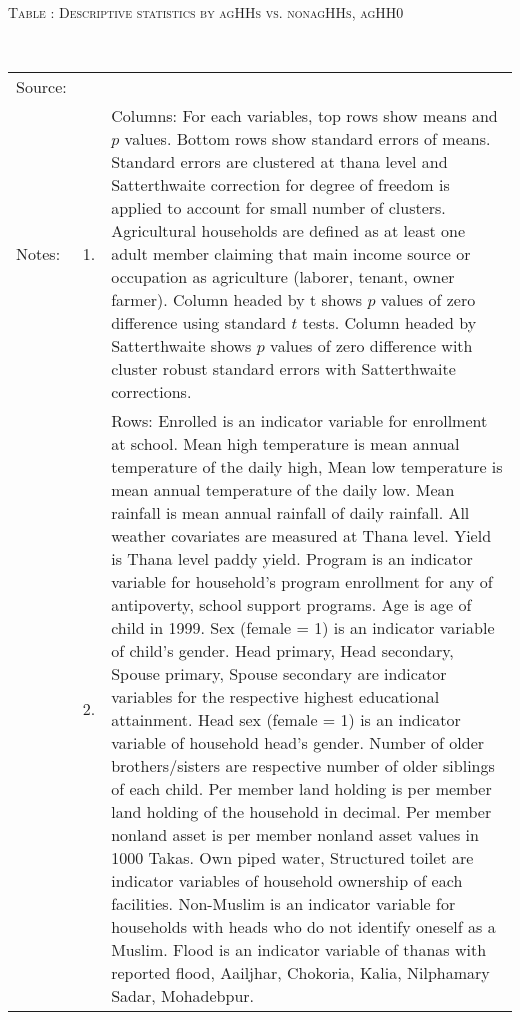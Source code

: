 \begin{minipage}[t]{14cm}
\hfil\textsc{\normalsize Table \thetable: Descriptive statistics by agHHs vs. nonagHHs, agHH0\label{tab destat by agHH0 CRSE}}\\
\setlength{\tabcolsep}{1pt}
\renewcommand{\arraystretch}{.70}
\hfil{}\\
\renewcommand{\arraystretch}{.7}
\setlength{\tabcolsep}{1pt}
\begin{tabular}{>{\hfill\scriptsize}p{1cm}<{}>{\hfill\scriptsize}p{.25cm}<{}>{\scriptsize}p{12cm}<{\hfill}}
Source:& \multicolumn{2}{l}{\scriptsize Compiled from IFPRI data. All information is of year 1999.}\\
Notes: & 1. & Columns: For each variables, top rows show means and $p$ values. Bottom rows show standard errors of means. Standard errors are clustered at thana level and Satterthwaite correction for degree of freedom is applied to account for small number of clusters. Agricultural households are defined as at least one adult member claiming that main income source or occupation as agriculture (laborer, tenant, owner farmer). Column headed by \textsf{t} shows $p$ values of zero difference using standard $t$ tests. Column headed by \textsf{Satterthwaite} shows $p$ values of zero difference with cluster robust standard errors with Satterthwaite corrections.\\
& 2. & Rows:  \textsf{Enrolled} is an indicator variable for enrollment at school. \textsf{Mean high temperature} is mean annual temperature of the daily high, \textsf{Mean low temperature} is mean annual temperature of the daily low. \textsf{Mean rainfall} is mean annual rainfall of daily rainfall. All weather covariates are measured at Thana level. \textsf{Yield} is Thana level paddy yield. \textsf{Program} is an indicator variable for household's program enrollment for any of antipoverty, school support programs. \textsf{Age} is age of child in 1999.  \textsf{Sex (female = 1)} is an indicator variable of child's gender. \textsf{Head primary, Head secondary, Spouse primary, Spouse secondary} are indicator variables for the respective highest educational attainment. \textsf{Head sex (female = 1)} is an indicator variable of household head's gender. \textsf{Number of older brothers/sisters} are respective number of older siblings of each child. \textsf{Per member land holding} is per member land holding of the household in decimal. \textsf{Per member nonland asset} is per member nonland asset values in 1000 Takas. \textsf{Own piped water, Structured toilet} are indicator variables of household ownership of each facilities. \textsf{Non-Muslim} is an indicator variable for households with heads who do not identify oneself as a Muslim. \textsf{Flood} is an indicator variable of thanas with reported flood, Aailjhar,  Chokoria, Kalia, Nilphamary Sadar, Mohadebpur. 
\end{tabular}
\end{minipage}\\ \vspace{2ex}


